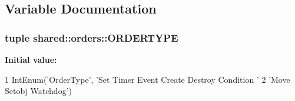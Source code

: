 \subsection{\-Variable \-Documentation}
\hypertarget{namespaceshared_1_1orders_afa012efe6f412d7cecc34589ae28e1eb}{
\subsubsection[{\-O\-R\-D\-E\-R\-T\-Y\-P\-E}]{\setlength{\rightskip}{0pt plus 5cm}tuple shared\-::orders\-::\-O\-R\-D\-E\-R\-T\-Y\-P\-E}}\label{namespaceshared_1_1orders_afa012efe6f412d7cecc34589ae28e1eb}
{\bfseries \-Initial value\-:}
\begin{DoxyCode}
1 IntEnum('OrderType', 'Set Timer Event Create Destroy Condition '
2                                  'Move Setobj Watchdog')
\end{DoxyCode}
